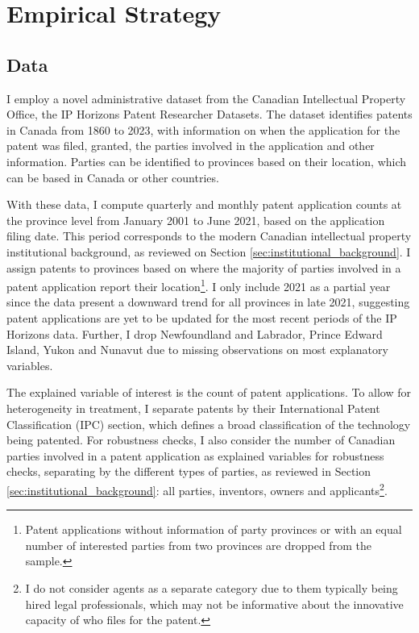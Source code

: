 \documentclass[../main.tex]{subfiles}
\begin{document}
\section{Empirical Strategy}
\label{sec:empirical_strategy}

\subsection{Data}

I employ a novel administrative dataset from the Canadian Intellectual Property Office, the IP Horizons Patent Researcher Datasets\nocite{canadianintellectualpropertyoffice23}. The dataset identifies patents in Canada from 1860 to 2023, with information on when the application for the patent was filed, granted, the parties involved in the application and other information. Parties can be identified to provinces based on their location, which can be based in Canada or other countries. 


With these data, I compute quarterly and monthly patent application counts at the province level from January 2001 to June 2021, based on the application filing date. This period corresponds to the modern Canadian intellectual property institutional background, as reviewed on Section \ref{sec:institutional_background}. I assign patents to provinces based on where the majority of parties involved in a patent application report their location\footnote{Patent applications without information of party provinces or with an equal number of interested parties from two provinces are dropped from the sample.}. I only include 2021 as a partial year since the data present a downward trend for all provinces in late 2021, suggesting patent applications are yet to be updated for the most recent periods of the IP Horizons data. Further, I drop Newfoundland and Labrador, Prince Edward Island, Yukon and Nunavut due to missing observations on most explanatory variables. 


The explained variable of interest is the count of patent applications. To allow for heterogeneity in treatment, I separate patents by their International Patent Classification (IPC) section, which defines a broad classification of the technology being patented. For robustness checks, I also consider the number of Canadian parties involved in a patent application as explained variables for robustness checks, separating by the different types of parties, as reviewed in Section \ref{sec:institutional_background}: all parties, inventors, owners and applicants\footnote{I do not consider agents as a separate category due to them typically being hired legal professionals, which may not be informative about the innovative capacity of who files for the patent.}.
\end{document}
